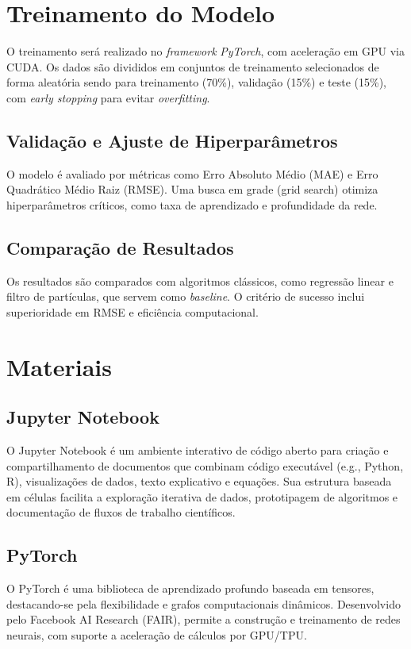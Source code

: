 \section{Treinamento do Modelo}
O treinamento será realizado no \textit{framework} \textit{PyTorch}, com aceleração em GPU via CUDA. Os dados são divididos em conjuntos de treinamento selecionados de forma aleatória sendo para treinamento (70\%), validação (15\%) e teste (15\%), com \textit{early stopping} para evitar \textit{overfitting}.  

\subsection{Validação e Ajuste de Hiperparâmetros}
O modelo é avaliado por métricas como Erro Absoluto Médio (MAE) e Erro Quadrático Médio Raiz (RMSE). Uma busca em grade (grid search) otimiza hiperparâmetros críticos, como taxa de aprendizado e profundidade da rede.  



\subsection{Comparação de Resultados}  
Os resultados são comparados com algoritmos clássicos, como regressão linear e filtro de partículas, que servem como \textit{baseline}. O critério de sucesso inclui superioridade em RMSE e eficiência computacional.


\section{Materiais}


\subsection{Jupyter Notebook} O Jupyter Notebook é um ambiente interativo de código aberto para criação e compartilhamento de documentos que combinam código executável (e.g., Python, R), visualizações de dados, texto explicativo e equações. Sua estrutura baseada em células facilita a exploração iterativa de dados, prototipagem de algoritmos e documentação de fluxos de trabalho científicos.

\subsection{PyTorch} O PyTorch é uma biblioteca de aprendizado profundo baseada em tensores, destacando-se pela flexibilidade e grafos computacionais dinâmicos. Desenvolvido pelo Facebook AI Research (FAIR), permite a construção e treinamento de redes neurais, com suporte a aceleração de cálculos por GPU/TPU.

